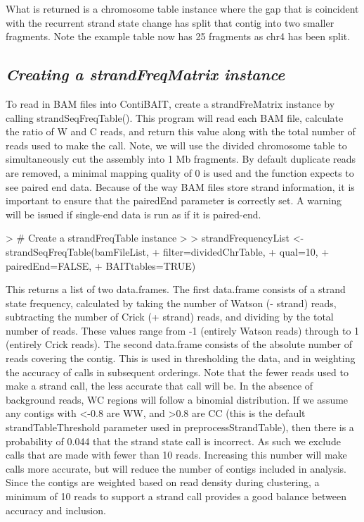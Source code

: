 \documentclass{article}
\begin{document}
What is returned is a chromosome table instance where the gap that is coincident with the recurrent strand state change has split that contig into two smaller fragments. Note the example table now has 25 fragments as chr4 has been split.

\subsection{\textit{Creating a strandFreqMatrix instance}}

To read in BAM files into ContiBAIT, create a strandFreMatrix instance by calling strandSeqFreqTable().  This program will read each BAM file, calculate the ratio of W and C reads, and return this value along with the total number of reads used to make the call. Note, we will use the divided chromosome table to simultaneously cut the assembly into 1 Mb fragments.  By default duplicate reads are removed, a minimal mapping quality of 0 is used and the function expects to see paired end data. Because of the way BAM files store strand information, it is important to ensure that the pairedEnd parameter is correctly set. A warning will be issued if single-end data is run as if it is paired-end.

\begin{Schunk}
\begin{Sinput}
> # Create a strandFreqTable instance 
> 
> strandFrequencyList <- strandSeqFreqTable(bamFileList, 
+ filter=dividedChrTable,
+ qual=10, 
+ pairedEnd=FALSE,
+ BAITtables=TRUE)
\end{Sinput}
\end{Schunk}

This returns a list of two data.frames.  The first data.frame consists of a strand state frequency, calculated by taking the number of Watson (- strand) reads, subtracting the number of Crick (+ strand) reads, and dividing by the total number of reads.  These values range from -1 (entirely Watson reads) through to 1 (entirely Crick reads).  The second data.frame consists of the absolute number of reads covering the contig. This is used in thresholding the data, and in weighting the accuracy of calls in subsequent orderings. Note that the fewer reads used to make a strand call, the less accurate that call will be. In the absence of background reads, WC regions will follow a binomial distribution. If we assume any contigs with <-0.8 are WW, and >0.8 are CC (this is the default strandTableThreshold parameter used in preprocessStrandTable), then there is a probability of 0.044 that the strand state call is incorrect. As such we exclude calls that are made with fewer than 10 reads. Increasing this number will make calls more accurate, but will reduce the number of contigs included in analysis. Since the contigs are weighted based on read density during clustering, a minimum of 10 reads to support a strand call provides a good balance between accuracy and inclusion.
\end{document}

